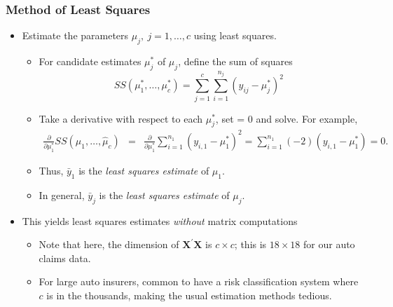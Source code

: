 \begin{frame}%
 \frametitle{Method of Least Squares}
   \begin{itemize}
    \item Estimate the parameters $\mu_j,~j=1, \ldots, c$ using least
    squares.
 \begin{itemize}
    \item For candidate estimates $\mu_j^{\ast}$ of $\mu_{j}$, define the sum of squares
\begin{equation*}
SS(\mu_1^{\ast},\ldots
,\mu_c^{\ast})=\sum_{j=1}^{c}\sum_{i=1}^{n_{j}}(y_{ij}-\mu_j^{\ast})^{2}
\end{equation*}
\item Take a derivative with respect to each $\mu_j^{\ast}$, set = 0 and solve. For example,
\begin{eqnarray*}
\frac{\partial}{\partial \mu_1^{\ast}}SS(\hat{\mu}_{1},\ldots
,\hat{\mu}_{c})&=& \frac{\partial}{\partial
\mu_1^{\ast}}\sum_{i=1}^{n_1}(y_{i,1}-\mu_1^{\ast})^{2} =
\sum_{i=1}^{n_1} (-2)(y_{i,1}-\mu_1^{\ast}) = 0.
\end{eqnarray*}
\item Thus, $\bar{y}_1$ is the \textit{least squares estimate }of $\mu
_1$.
\item In general, $\bar{y}_{j}$ is the \textit{least squares estimate }of $\mu
_{j}$.
  \end{itemize}
  \item This yields least
  squares estimates \emph{without} matrix computations
  \begin{itemize}
    \item Note that here, the dimension of $\mathbf{X^{\prime}X}$ is
    $c \times c$; this is $18 \times 18$ for our auto claims data.
    \item For large auto insurers, common to have
    a risk classification system where $c$ is in the thousands,
    making the usual estimation methods tedious.
  \end{itemize}
  \end{itemize}

    \end{frame}

